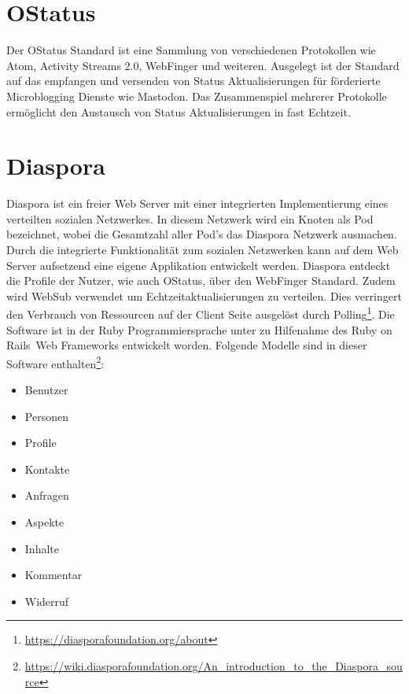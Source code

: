 \section{OStatus}
\label{sub:ostatus}
	Der OStatus Standard ist eine Sammlung von verschiedenen Protokollen wie Atom, Activity Streams 2.0, WebFinger und weiteren. Ausgelegt ist der Standard auf das empfangen und versenden von Status Aktualisierungen für förderierte Microblogging Dienste wie Mastodon. Das Zusammenspiel mehrerer Protokolle ermöglicht den Austausch von Status Aktualisierungen in fast Echtzeit.\\
\section{Diaspora}
\label{sub:diaspora}
	Diaspora ist ein freier Web Server mit einer integrierten Implementierung eines verteilten sozialen Netzwerkes. In diesem Netzwerk wird ein Knoten als Pod bezeichnet, wobei die Gesamtzahl aller Pod's das Diaspora Netzwerk ausmachen. Durch die integrierte Funktionalität zum sozialen Netzwerken kann auf dem Web Server aufsetzend eine eigene Applikation entwickelt werden. Diaspora entdeckt die Profile der Nutzer, wie auch OStatus, über den WebFinger Standard. Zudem wird WebSub verwendet um Echtzeitaktualisierungen zu verteilen. Dies verringert den Verbrauch von Ressourcen auf der Client Seite ausgelöst durch Polling\footnote{\url{https://diasporafoundation.org/about}}. Die Software ist in der Ruby Programmiersprache unter zu Hilfenahme des \glqq Ruby on Rails\grqq~Web Frameworks entwickelt worden. Folgende Modelle sind in dieser Software enthalten\footnote{\url{https://wiki.diasporafoundation.org/An_introduction_to_the_Diaspora_source}}:
	\begin{itemize}
		\item Benutzer
		\item Personen
		\item Profile
		\item Kontakte
		\item Anfragen
		\item Aspekte
		\item Inhalte
		\item Kommentar
		\item Widerruf
	\end{itemize}
